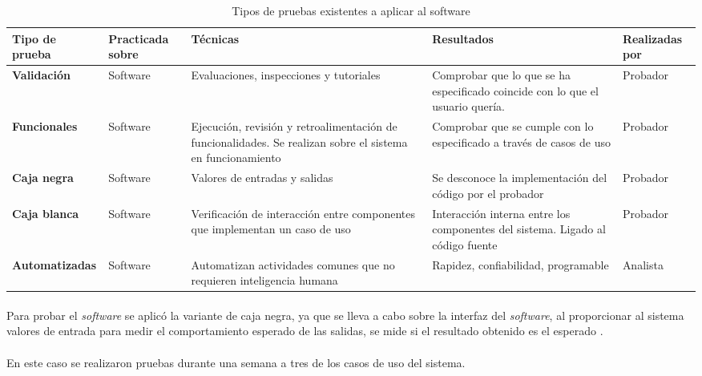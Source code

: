 \begin{table}[ht]
	\begin{tabular}{ |p{3cm}|p{2cm}|p{4cm}|p{4cm}|p{2cm}| }
		\hline
		\textbf{Tipo de prueba}
		& \textbf{Practicada sobre}
		& \textbf{Técnicas}
		& \textbf{Resultados}
		& \textbf{Realizadas por} \\ \hline
		
		\textbf{Validación}
		& Software
		& Evaluaciones, inspecciones y tutoriales
		& Comprobar que lo que se ha especificado coincide con lo que el usuario quería.
		& Probador \\ \hline
		
		\textbf{Funcionales}
		& Software
		& Ejecución, revisión y retroalimentación de funcionalidades. Se realizan sobre el sistema en funcionamiento
		& Comprobar que se cumple con lo especificado a través de casos de uso
		& Probador \\ \hline
		
		\textbf{Caja negra}
		& Software
		& Valores de entradas y salidas
		& Se desconoce la implementación del código por el probador
		& Probador \\ \hline
		
		\textbf{Caja blanca}
		& Software
		& Verificación de  interacción entre componentes que implementan un caso de uso
		& Interacción interna entre los componentes del sistema. Ligado al código fuente
		& Probador \\ \hline
		
		\textbf{Automatizadas}
		& Software
		& Automatizan actividades comunes que no requieren inteligencia humana
		& Rapidez, confiabilidad, programable
		& Analista \\
		
		\hline
	\end{tabular}
	\caption[Tipos de pruebas existentes a aplicar al software]{Tipos de pruebas existentes a aplicar al software \cite{pittet_distintos_nodate}}
	\label{table:TiposPruebas}
\end{table}

\paragraph{}Para probar el \textit{software} se aplicó la variante de caja negra, ya que se lleva a cabo sobre la interfaz del \textit{software}, al proporcionar al sistema valores de entrada para medir el comportamiento esperado de las salidas, se mide si el resultado obtenido es el esperado \cite{pittet_distintos_nodate}.
\paragraph{}En este caso se realizaron pruebas durante una semana a tres de los casos de uso del sistema.

